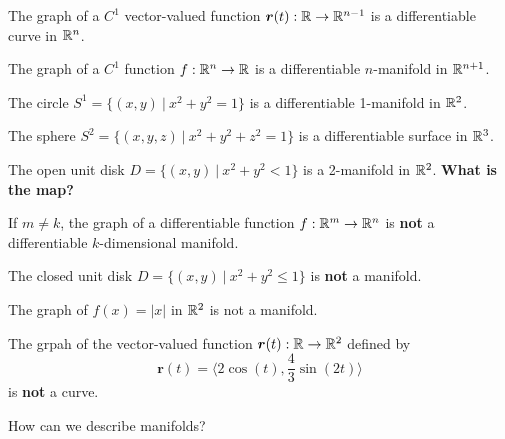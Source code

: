 \begin{example}
    The graph of a $C^1$ vector-valued function $\bm{r}(t) : \mathbb{R} \to \mathbb{R}^{n-1}$  is a differentiable curve in $\mathbb{R}^n$.
    \end{example}


\begin{example}
    The graph of a $C^1$ function $f : \mathbb{R}^n \to \mathbb{R}$  is a differentiable $n$-manifold in $\mathbb{R}^{n+1}$.
    \end{example}

\begin{example}
    The circle $S^1 = \{(x,y) \ | \ x^2 + y^2 = 1\}$ is a differentiable 1-manifold in $\mathbb{R}^2$.
    \end{example}    

\begin{example}
    The sphere $S^2= \{(x,y,z) \ | \ x^2 + y^2 + z^2 = 1\}$ is a differentiable surface in $\mathbb{R}^3$.
    \end{example}

\begin{example}
    The open unit disk $D = \{(x,y) \ | \ x^2 + y^2 < 1 \}$ is a 2-manifold in $\mathbb{R}^2$. \textbf{What is the map?}
    \end{example}


\begin{example}
        If $m \neq k$, the graph of a differentiable function $f : \mathbb{R}^m  \to \mathbb{R}^{n}$  is \textbf{not} a differentiable $k$-dimensional manifold.
    \end{example}

\begin{example}
    The closed unit disk $D = \{(x,y) \ | \ x^2 + y^2 \leq 1 \}$ is \textbf{not} a manifold.
    \end{example}


    \begin{example}
    The graph of $f(x) = |x|$ in $\mathbb{R}^2$ is not a manifold.  
    \end{example}

    \begin{example}
   The grpah of the vector-valued function $\bm{r}(t) : \mathbb{R} \to \mathbb{R}^2$ defined by $$\bm{r}(t) =  \langle 2\cos(t), \frac{4}{3}\sin(2t) \rangle$$ is \textbf{not} a curve.
    \end{example}


\begin{motivating}
    How can we describe manifolds?  
\end{motivating}

